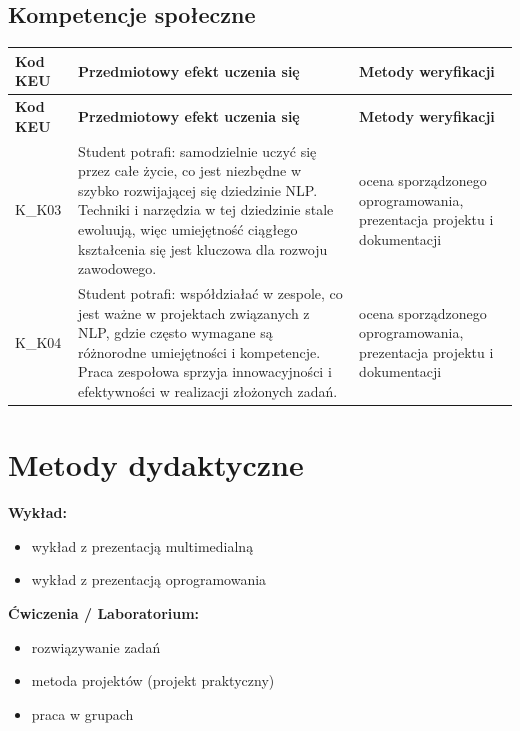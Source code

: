 \documentclass[12pt, a4paper]{article}
\newcommand{\thdrule}{\noalign{\global\setlength{\extrarowheight}{0pt}}}
\newcommand{\thdend}{\noalign{\global\setlength{\extrarowheight}{3pt}}}
\begin{document}
\subsection*{Kompetencje społeczne}
{\scriptsize
\begin{longtable}{m{1.6cm}m{9.0cm}m{4.2cm}}
\thdrule\toprule
\rowcolor{pjatkRed} {\color{white}\footnotesize\textbf{\vphantom{Ag}Kod KEU}} & {\color{white}\footnotesize\textbf{\vphantom{Ag}Przedmiotowy efekt uczenia się}} & {\color{white}\footnotesize\textbf{\vphantom{Ag}Metody weryfikacji}} \\
\midrule\thdend
\endfirsthead
\thdrule\toprule
\rowcolor{pjatkRed} {\color{white}\footnotesize\textbf{\vphantom{Ag}Kod KEU}} & {\color{white}\footnotesize\textbf{\vphantom{Ag}Przedmiotowy efekt uczenia się}} & {\color{white}\footnotesize\textbf{\vphantom{Ag}Metody weryfikacji}} \\
\midrule\thdend
\endhead
  \rowcolor{tableRowLight} K\_K03 & Student potrafi: samodzielnie uczyć się przez całe życie, co jest niezbędne w szybko rozwijającej się dziedzinie NLP. Techniki i narzędzia w tej dziedzinie stale ewoluują, więc umiejętność ciągłego kształcenia się jest kluczowa dla rozwoju zawodowego. & ocena sporządzonego oprogramowania, prezentacja projektu i dokumentacji \\
  \rowcolor{tableRowAlt} K\_K04 & Student potrafi: współdziałać w zespole, co jest ważne w projektach związanych z NLP, gdzie często wymagane są różnorodne umiejętności i kompetencje. Praca zespołowa sprzyja innowacyjności i efektywności w realizacji złożonych zadań. & ocena sporządzonego oprogramowania, prezentacja projektu i dokumentacji \\
\bottomrule
\end{longtable}}

\section{Metody dydaktyczne}

\textbf{Wykład:}
\begin{itemize}
  \item wykład z prezentacją multimedialną
  \item wykład z prezentacją oprogramowania
\end{itemize}
\vspace{4pt}
\textbf{Ćwiczenia / Laboratorium:}
\begin{itemize}
  \item rozwiązywanie zadań
  \item metoda projektów (projekt praktyczny)
  \item praca w grupach
\end{itemize}
\vspace{4pt}
\end{document}
